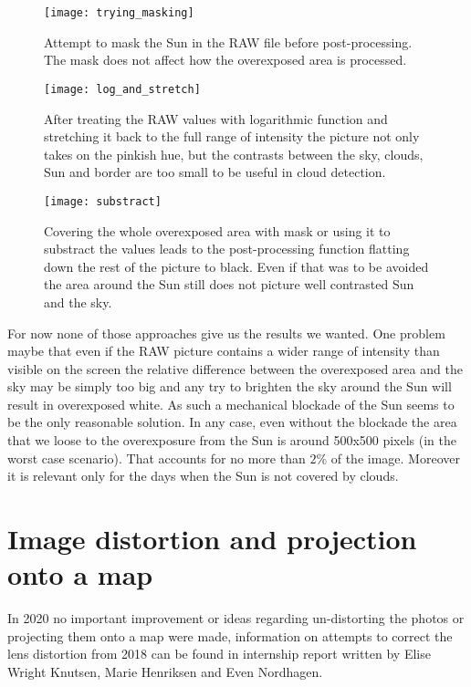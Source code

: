 \documentclass[]{book}
\begin{document}
		\begin{figure}
			\centering
			\texttt{[image: trying\_masking]}
			\label{fig: masking Sun}
			\caption{Attempt to mask the Sun in the RAW file before post-processing. The mask does not affect how the overexposed area is processed.}
		\end{figure}
		
		\begin{figure}
			\centering
			\texttt{[image: log\_and\_stretch]}
			\label{fig: log attempts}
			\caption{After treating the RAW values with logarithmic function and stretching it back to the full range of intensity the picture not only takes on the pinkish hue, but the contrasts between the sky, clouds, Sun and border are too small to be useful in cloud detection.}
		\end{figure}
		
		\begin{figure}
			\centering
			\texttt{[image: substract]}
			\label{fig: substract}
			\caption{Covering the whole overexposed area with mask or using it to substract the values leads to the post-processing function flatting down the rest of the picture to black. Even if that was to be avoided the area around the Sun still does not picture well contrasted Sun and the sky.}
		\end{figure}
		
		For now none of those approaches give us the results we wanted. One problem maybe that even if the RAW picture contains a wider range of intensity than visible on the screen the relative difference between the overexposed area and the sky may be simply too big and any try to brighten the sky around the Sun will result in overexposed white. As such a mechanical blockade of the Sun seems to be the only reasonable solution. In any case, even without the blockade the area that we loose to the overexposure from the Sun is around 500x500 pixels (in the worst case scenario). That accounts for no more than $ 2\% $ of the image. Moreover it is relevant only for the days when the Sun is not covered by clouds.
		
	\section{Image distortion and projection onto a map}
	
	In 2020 no important improvement or ideas regarding un-distorting the photos or projecting them onto a map were made, information on attempts to correct the lens distortion from 2018 can be found in internship report written by Elise Wright Knutsen, Marie Henriksen and Even Nordhagen.
	
\end{document}
